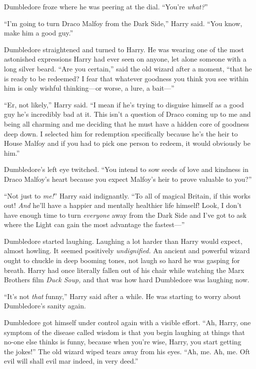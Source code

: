 Dumbledore froze where he was peering at the dial. “You’re \emph{what?}”

“I’m going to turn Draco Malfoy from the Dark Side,” Harry said. “You know, make him a good guy.”

Dumbledore straightened and turned to Harry. He was wearing one of the most astonished expressions Harry had ever seen on anyone, let alone someone with a long silver beard. “Are you certain,” said the old wizard after a moment, “that he is ready to be redeemed? I fear that whatever goodness you think you see within him is only wishful thinking—or worse, a lure, a bait—”

“Er, not likely,” Harry said. “I mean if he’s trying to disguise himself as a good guy he’s incredibly bad at it. This isn’t a question of Draco coming up to me and being all charming and me deciding that he must have a hidden core of goodness deep down. I selected him for redemption specifically because he’s the heir to House Malfoy and if you had to pick one person to redeem, it would obviously be him.”

Dumbledore’s left eye twitched. “You intend to sow seeds of love and kindness in Draco Malfoy’s heart because you expect Malfoy’s heir to prove valuable to you?”

“Not just to \emph{me!}” Harry said indignantly. “To all of magical Britain, if this works out! \emph{And} he’ll have a happier and mentally healthier life himself! Look, I don’t have enough time to turn \emph{everyone} away from the Dark Side and I’ve got to ask where the Light can gain the most advantage the fastest—”

Dumbledore started laughing. Laughing a lot harder than Harry would expect, almost howling. It seemed positively \emph{undignified.} An ancient and powerful wizard ought to chuckle in deep booming tones, not laugh so hard he was gasping for breath. Harry had once literally fallen out of his chair while watching the Marx Brothers film \emph{Duck Soup,} and that was how hard Dumbledore was laughing now.

“It’s not \emph{that} funny,” Harry said after a while. He was starting to worry about Dumbledore’s sanity again.

Dumbledore got himself under control again with a visible effort. “Ah, Harry, one symptom of the disease called wisdom is that you begin laughing at things that no-one else thinks is funny, because when you’re wise, Harry, you start getting the jokes!” The old wizard wiped tears away from his eyes. “Ah, me. Ah, me. Oft evil will shall evil mar indeed, in very deed.”


